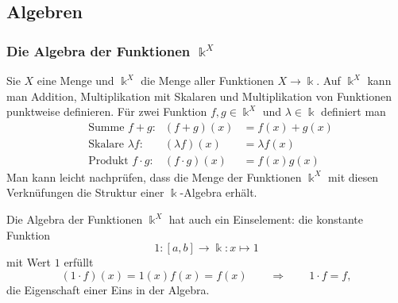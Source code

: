 %
%
%
\subsection{Algebren
\label{buch:grundlagen:subsection:algebren}}

\subsubsection{Die Algebra der Funktionen $\Bbbk^X$}
Sie $X$ eine Menge und $\Bbbk^X$ die Menge aller Funktionen $X\to \Bbbk$.
Auf $\Bbbk^X$ kann man Addition, Multiplikation mit Skalaren und
Multiplikation von Funktionen punktweise definieren.
Für zwei Funktion $f,g\in\Bbbk^X$ und $\lambda\in\Bbbk$ definiert man
\[
\begin{aligned}
&\text{Summe $f+g$:}
&
(f+g)(x) &= f(x)+g(x)
\\
&\text{Skalare $\lambda f$:}
&
(\lambda f)(x) &= \lambda f(x)
\\
&\text{Produkt $f\cdot g$:}
&
(f\cdot g)(x) &= f(x) g(x)
\end{aligned}
\]
Man kann leicht nachprüfen, dass die Menge der Funktionen $\Bbbk^X$
mit diesen Verknüfungen die Struktur einer $\Bbbk$-Algebra erhält.

Die Algebra der Funktionen $\Bbbk^X$ hat auch ein Einselement:
die konstante Funktion
\[
1\colon [a,b] \to \Bbbk : x \mapsto 1
\]
mit Wert $1$ erfüllt
\[
(1\cdot f)(x) = 1(x) f(x) = f(x)
\qquad\Rightarrow\qquad 1\cdot f = f,
\]
die Eigenschaft einer Eins in der Algebra.


